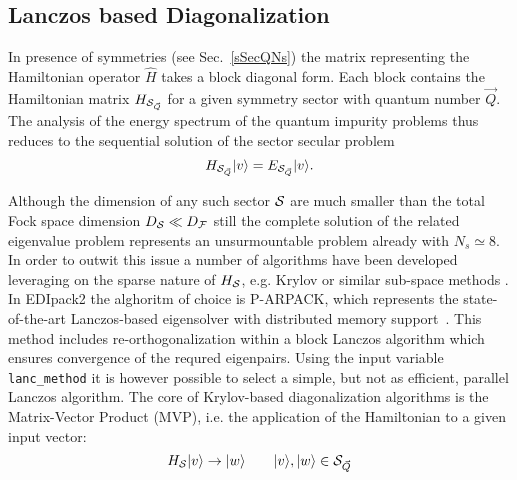 \documentclass[preprint,3p,10pt]{elsarticle}
\newcommand{\secu}[1]
{Sec.~\ref{#1}}
\newcommand{\ket}[1]
{|#1\rangle}
\def\a{\alpha}       \def\b{\beta}   \def\g{\gamma}   \def\d{\delta}
\def\e{\varepsilon}  \def\z{\zeta}   \def\h{\eta}     \def\th{\theta}
\def\NAME{{\rm EDIpack2 }}
\begin{document}

\subsection{Lanczos based Diagonalization}\label{sSecHam}
In presence of symmetries (see \secu{sSecQNs}) the matrix representing
the Hamiltonian operator $\hat{H}$ takes a block diagonal form. Each block
contains the Hamiltonian matrix $H_{{\cal S}_{\vec{Q}}}$ for a
given symmetry sector with quantum number $\vec{Q}$.
The analysis of the energy spectrum of the quantum impurity problems
thus reduces to the sequential solution of the sector secular problem
$$
H_{\SS_{\vec{Q}}}\ket{v}=E_{\SS_{\vec{Q}}}\ket{v}.
$$

Although the dimension of any such sector ${\cal S}$ are much smaller than the
total Fock space dimension $D_{\cal S} \ll D_{\cal F}$ still the complete solution of
the related eigenvalue problem represents an unsurmountable problem
already with $N_s\simeq 8$. 
In order to outwit this issue a number of
algorithms have been developed leveraging on the sparse nature of
$H_{\cal S}$, e.g. Krylov or similar sub-space methods \cite{Lanczos,Arnoldi,Feast}.   
In \NAME the alghoritm of choice is P-ARPACK, which represents the
state-of-the-art Lanczos-based eigensolver with distributed memory
support~\cite{P-Arpack}. This method includes re-orthogonalization
within a block Lanczos algorithm which ensures convergence of the
requred eigenpairs. Using the input variable {\tt lanc\_method} it is
however possible to select a simple, but not as efficient, parallel
Lanczos algorithm.
The core of Krylov-based diagonalization algorithms is the Matrix-Vector Product
(MVP), i.e. the application of the Hamiltonian to a given input
vector:
$$
H_\SS \ket{v} \to \ket{w}\qquad \ket{v},\ket{w}\in \SS_{\vec{Q}}
$$
\end{document}
